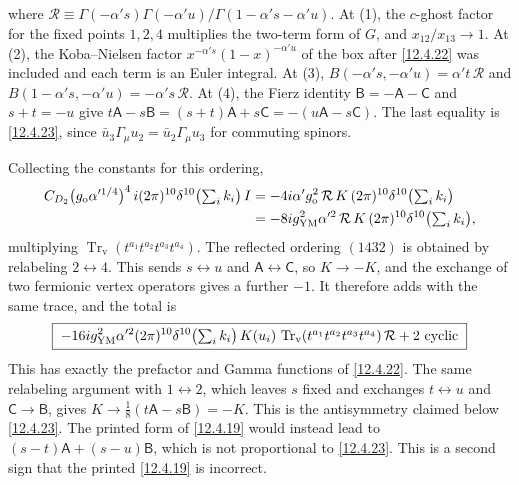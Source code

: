 \begin{tcolorbox}[breakable]
\begin{remark}
		where $\mathcal R\equiv\Gamma(-\alpha's)\Gamma(-\alpha'u)/\Gamma(1-\alpha's-\alpha'u)$. At (1), the $c$-ghost factor for the fixed points $1,2,4$ multiplies the two-term form of $G$, and $x_{12}/x_{13}\to1$. At (2), the Koba--Nielsen factor $x^{-\alpha's}(1-x)^{-\alpha'u}$ of the box after \eqref{12.4.22} was included and each term is an Euler integral. At (3), $B(-\alpha's,-\alpha'u)=\alpha't\,\mathcal R$ and $B(1-\alpha's,-\alpha'u)=-\alpha's\,\mathcal R$. At (4), the Fierz identity $\mathsf B=-\mathsf A-\mathsf C$ and $s+t=-u$ give $t\mathsf A-s\mathsf B=(s+t)\mathsf A+s\mathsf C=-(u\mathsf A-s\mathsf C)$. The last equality is \eqref{12.4.23}, since $\bar u_{3}\Gamma_{\mu}u_{2}=\bar u_{2}\Gamma_{\mu}u_{3}$ for commuting spinors.

		Collecting the constants for this ordering,
		\begin{align*}
			C_{D_2}\bigl(g_{\mathrm{o}}\alpha'^{1/4}\bigr)^{4}\,i(2\pi)^{10}\delta^{10}\bigl(\textstyle\sum_i k_{i}\bigr)\,I
			&=-4i\alpha' g_{\mathrm{o}}^{2}\,\mathcal R\,K\,(2\pi)^{10}\delta^{10}\bigl(\textstyle\sum_i k_{i}\bigr)\\
			&=-8i g_{\mathrm{YM}}^{2}\alpha'^{2}\,\mathcal R\,K\,(2\pi)^{10}\delta^{10}\bigl(\textstyle\sum_i k_{i}\bigr) ,
		\end{align*}
		multiplying $\operatorname{Tr}_{\mathrm{v}}(t^{a_1}t^{a_2}t^{a_3}t^{a_4})$. The reflected ordering $(1432)$ is obtained by relabeling $2\leftrightarrow4$. This sends $s\leftrightarrow u$ and $\mathsf A\leftrightarrow\mathsf C$, so $K\to-K$, and the exchange of two fermionic vertex operators gives a further $-1$. It therefore adds with the same trace, and the total is
		\[
		\boxed{\;-16i g_{\mathrm{YM}}^{2}\alpha'^{2}(2\pi)^{10}\delta^{10}\bigl(\textstyle\sum_i k_{i}\bigr)\,K(u_{i})\,\operatorname{Tr}_{\mathrm{v}}(t^{a_1}t^{a_2}t^{a_3}t^{a_4})\,\mathcal R+2\text{ cyclic}\;}
		\]
		This has exactly the prefactor and Gamma functions of \eqref{12.4.22}. The same relabeling argument with $1\leftrightarrow2$, which leaves $s$ fixed and exchanges $t\leftrightarrow u$ and $\mathsf C\to\mathsf B$, gives $K\to\frac18(t\mathsf A-s\mathsf B)=-K$. This is the antisymmetry claimed below \eqref{12.4.23}. The printed form of \eqref{12.4.19} would instead lead to $(s-t)\mathsf A+(s-u)\mathsf B$, which is not proportional to \eqref{12.4.23}. This is a second sign that the printed \eqref{12.4.19} is incorrect.
	\end{remark}
\end{tcolorbox}

